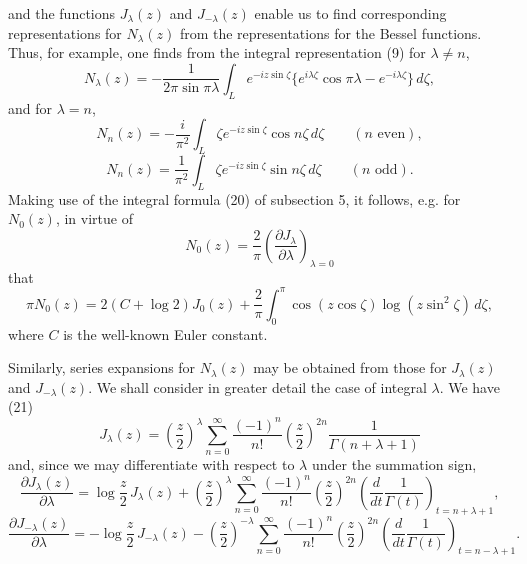 and the functions $J_\lambda(z)$ and $J_{-\lambda}(z)$ enable us to find corresponding representations for $N_\lambda(z)$ from the representations for the Bessel functions. Thus, for example, one finds from the integral representation (9) for $\lambda\ne n$,
\begin{equation}\tag{41}
N_\lambda(z)=-\frac1{2\pi\sin\pi\lambda}\int_L e^{-iz\sin\zeta}
\{e^{i\lambda\zeta}\cos\pi\lambda-e^{-i\lambda\zeta}\}\,d\zeta,
\end{equation}
and for $\lambda=n$,
\begin{equation}\tag{42}
N_n(z)=-\frac{i}{\pi^2}\int_L\zeta e^{-iz\sin\zeta}\cos n\zeta\,d\zeta
\qquad(n\text{ even}),
\end{equation}
\begin{equation}\tag{42'}
N_n(z)=\frac1{\pi^2}\int_L\zeta e^{-iz\sin\zeta}\sin n\zeta\,d\zeta
\qquad(n\text{ odd}).
\end{equation}
Making use of the integral formula (20) of subsection 5, it follows, e.g. for $N_0(z)$, in virtue of
\[
N_0(z)=\frac2\pi\left(\frac{\partial J_\lambda}{\partial\lambda}\right)_{\lambda=0}
\]
that
\begin{equation}\tag{43}
\pi N_0(z)=2(C+\log2)J_0(z)+\frac2\pi\int_0^\pi
\cos(z\cos\zeta)\log(z\sin^2\zeta)\,d\zeta,
\end{equation}
where $C$ is the well-known Euler constant.

Similarly, series expansions for $N_\lambda(z)$ may be obtained from those for $J_\lambda(z)$ and $J_{-\lambda}(z)$. We shall consider in greater detail the case of integral $\lambda$. We have (21)
\[
J_\lambda(z)=\left(\frac z2\right)^\lambda\sum_{n=0}^{\infty}
\frac{(-1)^n}{n!}\left(\frac z2\right)^{2n}\frac1{\Gamma(n+\lambda+1)}
\]
and, since we may differentiate with respect to $\lambda$ under the summation sign,
\[
\frac{\partial J_\lambda(z)}{\partial\lambda}=\log\frac z2\,J_\lambda(z)
+\left(\frac z2\right)^\lambda\sum_{n=0}^{\infty}\frac{(-1)^n}{n!}
\left(\frac z2\right)^{2n}
\left(\frac d{dt}\frac1{\Gamma(t)}\right)_{t=n+\lambda+1},
\]
\begin{equation}\tag{44}
\frac{\partial J_{-\lambda}(z)}{\partial\lambda}=-\log\frac z2\,J_{-\lambda}(z)
-\left(\frac z2\right)^{-\lambda}\sum_{n=0}^{\infty}\frac{(-1)^n}{n!}
\left(\frac z2\right)^{2n}
\left(\frac d{dt}\frac1{\Gamma(t)}\right)_{t=n-\lambda+1}.
\end{equation}

